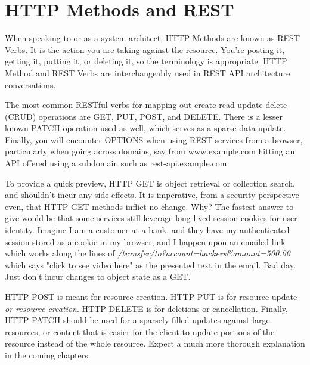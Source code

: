 \section{HTTP Methods and REST}

When speaking to or as a system architect, HTTP Methods are known as REST Verbs.  It is the action you are taking against the resource.  You're posting it, getting it, putting it, or deleting it, so the terminology is appropriate.  HTTP Method and REST Verbs are interchangeably used in REST API architecture conversations.

The most common RESTful verbs for mapping out create-read-update-delete (CRUD) operations are GET, PUT, POST, and DELETE.  There is a lesser known PATCH operation used as well, which serves as a sparse data update.  Finally, you will encounter OPTIONS when using REST services from a browser, particularly when going across domains, say from www.example.com hitting an API offered using a subdomain such as rest-api.example.com.

To provide a quick preview, HTTP GET is object retrieval or collection search, and shouldn't incur any side effects.  It is imperative, from a security perspective even, that HTTP GET methods inflict no change.  Why?  The fastest answer to give would be that some services still leverage long-lived session cookies for user identity.  Imagine I am a customer at a bank, and they have my authenticated session stored as a cookie in my browser, and I happen upon an emailed link which works along the lines of \textit{/transfer/to?account=hackers\&amount=500.00} which says "click to see video here" as the presented text in the email.  Bad day.  Just don't incur changes to object state as a GET.

HTTP POST is meant for resource creation.  HTTP PUT is for resource update \textit{or resource creation}.  HTTP DELETE is for deletions or cancellation.  Finally, HTTP PATCH should be used for a sparsely filled updates against large resources, or content that is easier for the client to update portions of the resource instead of the whole resource.  Expect a much more thorough explanation in the coming chapters.

